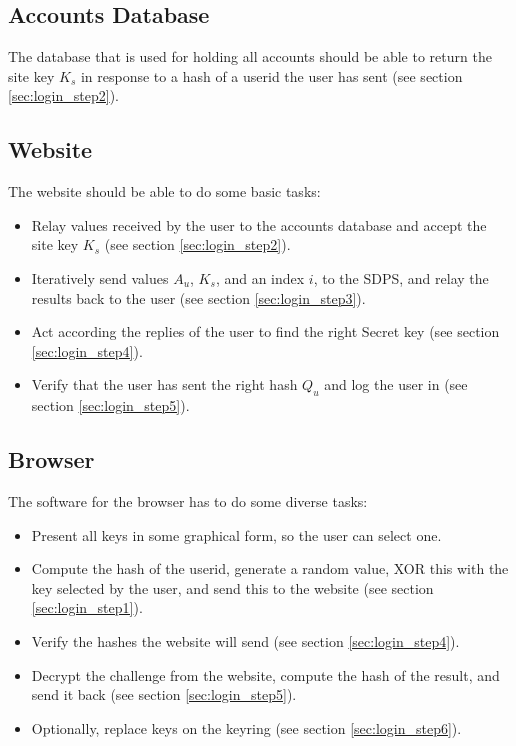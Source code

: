\subsection{Accounts Database}
The database that is used for holding all accounts should be able to return the site key $K_s$ in response to a \SHA hash of a userid the user has sent (see section \ref{sec:login_step2}).

\subsection{Website}
The website should be able to do some basic tasks:
\begin{itemize}
\item Relay values received by the user to the accounts database and accept the site key $K_s$ (see section \ref{sec:login_step2}).
\item Iteratively send values $A_u$, $K_s$, and an index $i$, to the SDPS, and relay the results back to the user (see section \ref{sec:login_step3}).
\item Act according the replies of the user to find the right Secret key (see section \ref{sec:login_step4}).
\item Verify that the user has sent the right hash $Q_u$ and log the user in (see section \ref{sec:login_step5}).
\end{itemize}

\subsection{Browser}
The software for the browser has to do some diverse tasks:
\begin{itemize}
\item Present all keys in some graphical form, so the user can select one.
\item Compute the \SHA hash of the userid,
generate a random value,
XOR this with the key selected by the user,
and send this to the website (see section \ref{sec:login_step1}).
\item Verify the \SHA hashes the website will send (see section \ref{sec:login_step4}).
\item Decrypt the challenge from the website,
compute the \SHA hash of the result,
and send it back (see section \ref{sec:login_step5}).
\item Optionally, replace keys on the keyring (see section \ref{sec:login_step6}).
\end{itemize}
